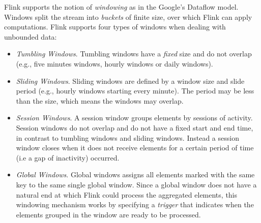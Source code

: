 Flink supports the notion of \emph{windowing} as in the Google's Dataflow model. Windows split the stream into \emph{buckets} of finite size, over which Flink can apply computations. Flink supports four types of windows when dealing with unbounded data:
\begin{itemize}
\item \emph{Tumbling Windows}. Tumbling windows have a \emph{fixed} size and do not overlap (e.g., five minutes windows, hourly windows or daily windows).
\item \emph{Sliding Windows}. Sliding windows are defined by a window size and slide period (e.g., hourly windows starting every minute). The period may be less than the size, which means the windows may overlap. 
\item \emph{Session Windows}. A session window groups elements by sessions of activity. Session windows do not overlap and do not have a fixed start and end time, in contrast to tumbling windows and sliding windows. Instead a session window closes when it does not receive elements for a certain period of time (i.e a gap of inactivity) occurred. 
\item \emph{Global Windows}. Global windows assigns all elements marked with the same key to the same single global window. Since a global window does not have a natural end at which Flink could process the aggregated elements, this windowing mechanism works by specifying a \emph{trigger} that indicates when the elements grouped in the window are ready to be processed. 
\end{itemize}

